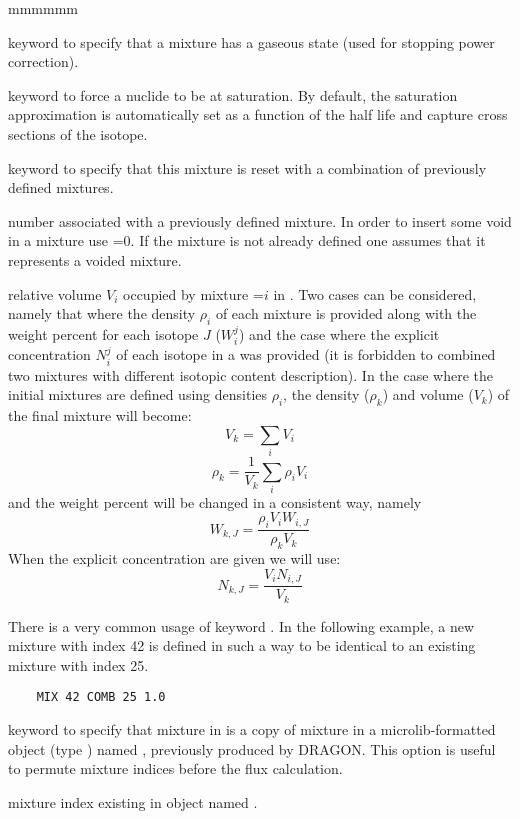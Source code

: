 \begin{ListeDeDescription}{mmmmmm}
\item[\moc{GAS}] keyword to specify that a mixture has a gaseous state (used for stopping power correction).

\item[\moc{SAT}] keyword to force a nuclide to be at saturation. By default, the saturation approximation is
automatically set as a function of the half life and capture cross sections of the isotope.

\item[\moc{COMB}]  keyword to specify that this mixture is reset with a
combination of previously defined mixtures.

\item[\dusa{mati}]  number associated with a previously defined mixture. In
order to insert some void in a mixture use =0. If the mixture is not
already defined one assumes that it represents a voided mixture.

\item[\dusa{relvol}] relative volume $V_{i}$ occupied by mixture
=$i$ in .  Two cases can be considered, namely that
where the density $\rho_{i}$ of each mixture  is provided along with
the weight percent for each isotope $J$ ($W_{i}^{j}$) and the case where the
explicit concentration $N_{i}^{j}$ of each isotope in a  was provided
(it is forbidden to combined two mixtures with different isotopic content
description). In the case where the initial mixtures are defined using densities
$\rho_{i}$, the density ($\rho_k$) and volume ($V_{k}$) of the final mixture
will become:
  $$V_{k}=\sum_{i} V_{i} $$
  $$\rho_{k}=\frac{1}{V_{k}} \sum_{i}\rho_{i}V_{i}$$
and the weight percent will be changed in a consistent way, namely
  $$W_{k,J}=\frac{\rho_{i}V_{i}W_{i,J}}{\rho_{k} V_{k} } $$
When the explicit concentration are given we will use:
  $$N_{k,J}=\frac{V_{i}N_{i,J}}{V_{k} } $$

\vskip 0.08cm

There is a very common usage of keyword . In the following example, a new mixture with index 42
is defined in such a way to be identical to an existing mixture with index 25. 
\begin{verbatim}
    MIX 42 COMB 25 1.0
\end{verbatim}

\item[\moc{COPY}]  keyword to specify that mixture  in  is a copy of mixture  in a
{\sc microlib}-formatted object (type ) named , previously produced by DRAGON. This option is
useful to permute mixture indices before the flux calculation.

\item[\dusa{numold}] mixture index existing in  object named .

\end{ListeDeDescription}

